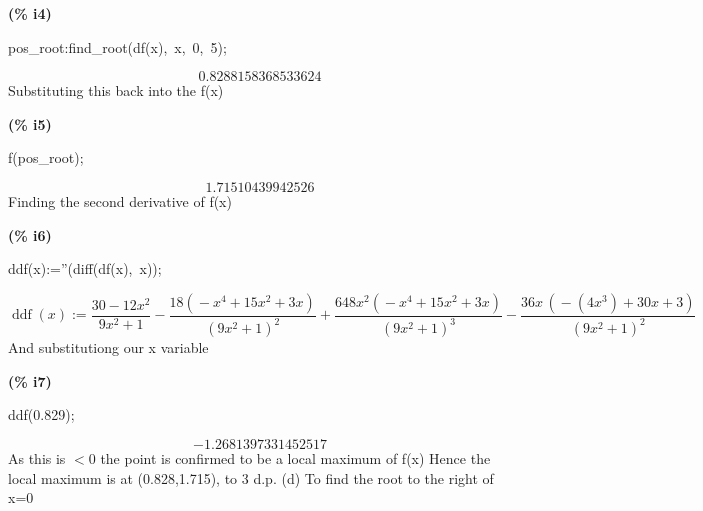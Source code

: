 \documentclass[fleqn]{article}
\begin{document}
\noindent
\begin{minipage}[t]{4.000000em}\color{red}\bfseries
(\% i4)	
\end{minipage}
\begin{minipage}[t]{\textwidth}\color{blue}
pos\_root:find\_root(df(x),\ x,\ 0,\ 5);
\end{minipage}
\[\displaystyle \tag{pos\_ root} 
0.8288158368533624\mbox{}
\]
Substituting this back into the f(x)


\noindent
\begin{minipage}[t]{4.000000em}\color{red}\bfseries
(\% i5)	
\end{minipage}
\begin{minipage}[t]{\textwidth}\color{blue}
f(pos\_root);
\end{minipage}
\[\displaystyle \tag{\% o5} 
1.71510439942526\mbox{}
\]
Finding the second derivative of f(x)


\noindent
\begin{minipage}[t]{4.000000em}\color{red}\bfseries
(\% i6)	
\end{minipage}
\begin{minipage}[t]{\textwidth}\color{blue}
ddf(x):=''(diff(df(x),\ x));
\end{minipage}
\[\displaystyle \tag{\% o6} 
\mathop{ddf}(x)\mathop{:=}\frac{30\mathop{-}12 {{x}^{2}}}{9 {{x}^{2}}\mathop{+}1}\mathop{-}\frac{18 \left( \mathop{-}{{x}^{4}}\mathop{+}15 {{x}^{2}}\mathop{+}3 x\right) }{{{\left( 9 {{x}^{2}}\mathop{+}1\right) }^{2}}}\mathop{+}\frac{648 {{x}^{2}} \left( \mathop{-}{{x}^{4}}\mathop{+}15 {{x}^{2}}\mathop{+}3 x\right) }{{{\left( 9 {{x}^{2}}\mathop{+}1\right) }^{3}}}\mathop{-
}\frac{36 x\, \left( \mathop{-}\left( 4 {{x}^{3}}\right) \mathop{+}30 x\mathop{+}3\right) }{{{\left( 9 {{x}^{2}}\mathop{+}1\right) }^{2}}}\mbox{}
\]
And substitutiong our x variable


\noindent
\begin{minipage}[t]{4.000000em}\color{red}\bfseries
(\% i7)	
\end{minipage}
\begin{minipage}[t]{\textwidth}\color{blue}
ddf(0.829);
\end{minipage}
\[\displaystyle \tag{\% o7} 
\mathop{-}1.2681397331452517\mbox{}
\]
As this is \ensuremath{<}0 the point is confirmed to be a local maximum of f(x)
Hence the local maximum is at (0.828,1.715), to 3 d.p.
(d) To find the root to the right of x=0
\end{document}
